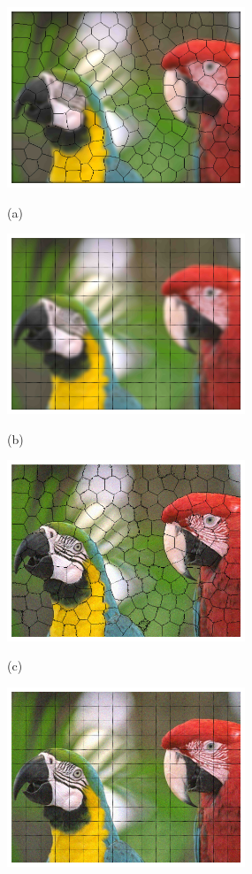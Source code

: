 	\begin{figure}[!ht]
		\centering
		\begin{minipage}[t]{.49\linewidth}
			\includegraphics[width=2.8in]{fig/parrot_superpixel_gaussian_blur.jpg}
			\centerline{(a)}
			\label{PARROT-superpixel-Gaussian-Blur}
		\end{minipage}
		\begin{minipage}[t]{.49\linewidth}
			\includegraphics[width=2.8in]{fig/parrot_square_gaussian_blur.jpg}
			\centerline{(b)}
			\label{PARROT-square-grid-Gaussian-Blur}
		\end{minipage}
		\begin{minipage}[t]{.49\linewidth}
			\includegraphics[width=2.8in]{fig/parrot_superpixel_gaussian_noise.jpg}
			\centerline{(c)}
			\label{PARROT-superpixel-Gaussian-Noise}
		\end{minipage}
		\begin{minipage}[t]{.49\linewidth}
			\includegraphics[width=2.8in]{fig/parrot_square_gaussian_noise.jpg}

\end{minipage}
\end{figure}
